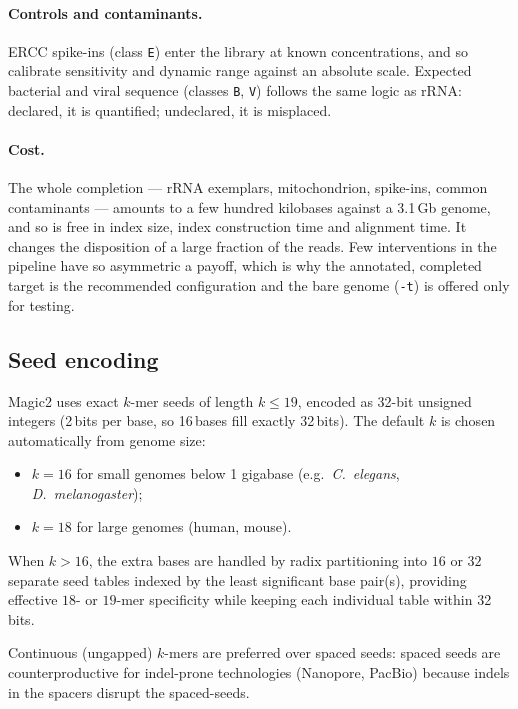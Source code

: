 \documentclass[11pt]{article}
\begin{document}
\paragraph{Controls and contaminants.}
ERCC spike-ins (class \texttt{E}) enter the library at known
concentrations, and so calibrate sensitivity and dynamic range against
an absolute scale.
Expected bacterial and viral sequence (classes \texttt{B}, \texttt{V})
follows the same logic as rRNA: declared, it is quantified; undeclared,
it is misplaced.

\paragraph{Cost.}
The whole completion --- rRNA exemplars, mitochondrion, spike-ins,
common contaminants --- amounts to a few hundred kilobases against a
3.1\,Gb genome, and so is free in index size, index construction time
and alignment time.
It changes the disposition of a large fraction of the reads.
Few interventions in the pipeline have so asymmetric a payoff, which is
why the annotated, completed target is the recommended configuration and
the bare genome (\texttt{-t}) is offered only for testing.

\subsection{Seed encoding}
\label{sec:seed_encoding}

Magic2 uses exact $k$-mer seeds of length $k \le 19$, encoded as
32-bit unsigned integers (2\,bits per base, so 16\,bases fill exactly
32\,bits).
The default $k$ is chosen automatically from genome size:
\begin{itemize}
  \item $k = 16$ for small genomes below 1 gigabase (e.g.\ \textit{C.~elegans},
        \textit{D.~melanogaster});
  \item $k = 18$ for large genomes (human, mouse).
\end{itemize}
When $k > 16$, the extra bases are handled by radix partitioning into
$16$ or $32$ separate seed tables indexed by the least significant
base pair(s), providing effective $18$- or $19$-mer specificity while
keeping each individual table within 32 bits.

Continuous (ungapped) $k$-mers are preferred over spaced seeds: spaced
seeds are counterproductive for indel-prone technologies (Nanopore,
PacBio) because indels in the spacers disrupt the spaced-seeds.
\end{document}

